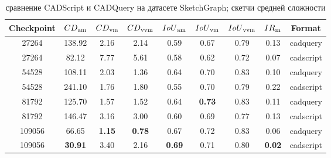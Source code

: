 \begin{table}[ht]
	\centering
	\caption{сравнение CADScript и CADQuery на датасете SketchGraph; скетчи средней сложности}
	\label{tab:my-table}
	\begin{tabular}{c c c c c c c c c}
		\hline
		\textbf{Checkpoint} & $CD\textsubscript{am}$ & $CD\textsubscript{vm}$ & $CD\textsubscript{vvm}$ & $IoU\textsubscript{am}$ & $IoU\textsubscript{vm}$ & $IoU\textsubscript{vvm}$ & $IR\textsubscript{m}$ & \textbf{Format} \\
		\hline
		27264               & 138.92                 & 2.16                   & 2.14                    & 0.59                    & 0.67                    & 0.79                     & 0.13                  & cadquery        \\
		27264               & 82.12                  & 7.77                   & 5.61                    & 0.58                    & 0.62                    & 0.72                     & 0.07                  & cadscript       \\
		54528               & 108.11                 & 2.03                   & 1.36                    & 0.64                    & 0.70                    & 0.83                     & 0.10                  & cadquery        \\
		54528               & 241.10                 & 1.76                   & 1.80                    & 0.55                    & 0.70                    & 0.79                     & 0.22                  & cadscript       \\
		81792               & 125.70                 & 1.57                   & 1.52                    & 0.64                    & \textbf{0.73}           & 0.83                     & 0.11                  & cadquery        \\
		81792               & 146.47                 & 3.16                   & 3.00                    & 0.60                    & 0.69                    & 0.77                     & 0.13                  & cadscript       \\
		109056              & 66.65                  & \textbf{1.15}          & \textbf{0.78}           & 0.67                    & 0.72                    & 0.83                     & 0.06                  & cadquery        \\
		109056              & \textbf{30.91}         & 3.40                   & 2.16                    & \textbf{0.69}           & 0.71                    & 0.80                     & \textbf{0.02}         & cadscript       \\

\end{tabular}
\end{table}
